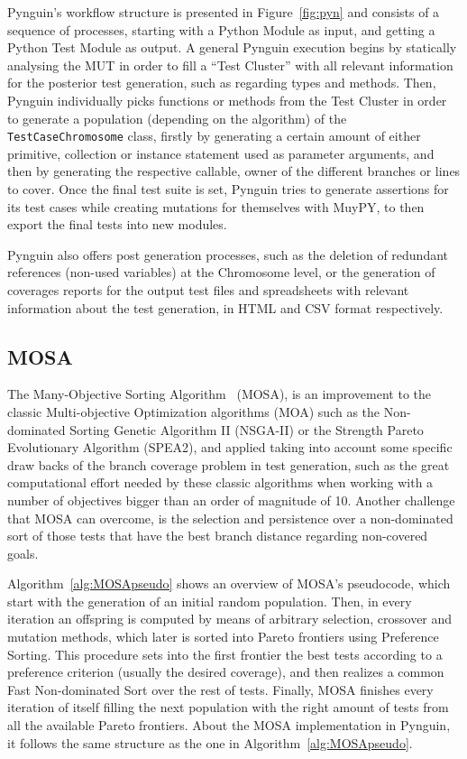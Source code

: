 \documentclass[%
  chapterprefix=false,%
  open=right,%
  twoside=true,%
  paper=a4,%
  logofile={Figures/logo.png},%
  thesistype=master,%
  UKenglish,%
]{se2thesis}
\newcommand{\classname}[1]{\texttt{#1}}
\begin{document}
Pynguin's workflow structure is presented in Figure~\ref{fig:pyn} and consists of a sequence of processes, starting with a Python Module as input, and getting a Python Test Module as output.
A general Pynguin execution begins by statically analysing the MUT in order to fill a ``Test Cluster'' with all relevant information for the posterior test generation, such as regarding types and methods.
Then, Pynguin individually picks functions or methods from the Test Cluster in order to generate a population (depending on the algorithm) of the \classname{TestCaseChromosome} class, firstly by generating a certain amount of either primitive, collection or instance statement used as parameter arguments, and then by generating the respective callable, owner of the different branches or lines to cover.
Once the final test suite is set, Pynguin tries to generate assertions for its test cases while creating mutations for themselves with MuyPY, to then export the final tests into new modules.

Pynguin also offers post generation processes, such as the deletion of redundant references (non-used variables) at the Chromosome level, or the generation of coverages reports for the output test files and spreadsheets with relevant information about the test generation, in HTML and CSV format respectively.

\newpage
\subsection{MOSA}

The Many-Objective Sorting Algorithm~\cite{DBLP:conf/icst/PanichellaKT15} (MOSA), is an improvement to the classic Multi-objective Optimization algorithms (MOA) such as the Non-dominated Sorting Genetic Algorithm II (NSGA-II) or the Strength Pareto Evolutionary Algorithm (SPEA2), and applied taking into account some specific draw backs of the branch coverage problem in test generation, such as the great computational effort needed by these classic algorithms when working with a number of objectives bigger than an order of magnitude of 10.
Another challenge that MOSA can overcome, is the selection and persistence over a non-dominated sort of those tests that have the best branch distance regarding non-covered goals.

Algorithm~\ref{alg:MOSApseudo} shows an overview of MOSA's pseudocode, which start with the generation of an initial random population.
Then, in every iteration an offspring is computed by means of arbitrary selection, crossover and mutation methods, which later is sorted into Pareto frontiers using Preference Sorting.
This procedure sets into the first frontier the best tests according to a preference criterion (usually the desired coverage), and then realizes a common Fast Non-dominated Sort over the rest of tests.
Finally, MOSA finishes every iteration of itself filling the next population with the right amount of tests from all the available Pareto frontiers.
About the MOSA implementation in Pynguin, it follows the same structure as the one in Algorithm~\ref{alg:MOSApseudo}.
\end{document}
